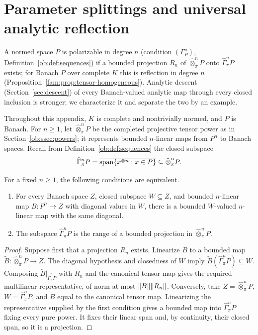 \section{Parameter splittings and universal analytic reflection}\label{app:reflection}\label{fam:sec:tensors}
A normed space $P$ is polarizable in degree $n$ (condition $(\Gamma^n_P)$, Definition~\ref{ob:def:sequences}) if a bounded
projection $R_n$ of $\widehat\otimes^n_\pi P$ onto $\widehat\Gamma^n_\pi P$ exists; for Banach $P$ over complete $K$ this is
reflection in degree $n$ (Proposition~\ref{fam:prop:tensor-homogeneous}). Analytic descent (Section~\ref{sec:descent}) of every
Banach-valued analytic map through every closed inclusion is stronger; we characterize it and separate the two by an example.

Throughout this appendix, $K$ is complete and nontrivially normed, and $P$ is Banach.
For $n\ge1$, let $\widehat\otimes^n_\pi P$ be the completed projective tensor power as in
Section~\ref{ob:ssec:powers}; it represents bounded $n$\nobreakdash-linear maps from $P^n$ to Banach spaces.
Recall from Definition~\ref{ob:def:sequences} the closed subspace
\[
 \widehat\Gamma^n_\pi P=\overline{\operatorname{span}\{x^{\otimes n}:x\in P\}}\subseteq \widehat\otimes^n_\pi P.
\]

\begin{proposition}\label{fam:prop:tensor-homogeneous}
For a fixed $n\ge1$, the following conditions are equivalent.
\begin{enumerate}
\item For every Banach space $Z$, closed subspace $W\subseteq Z$, and bounded $n$\nobreakdash-linear map
$B\colon P^n\to Z$ with diagonal values in $W$, there is a bounded $W$\nobreakdash-valued
$n$\nobreakdash-linear map with the same diagonal.
\item The subspace $\widehat\Gamma^n_\pi P$ is the range of a bounded projection in $\widehat\otimes^n_\pi P$.
\end{enumerate}
\end{proposition}

\begin{proof}
Suppose first that a projection $R_n$ exists. Linearize $B$ to a bounded map
$\widetilde B\colon \widehat\otimes^n_\pi P\to Z$. The diagonal hypothesis and closedness of $W$ imply
$\widetilde B(\widehat\Gamma^n_\pi P)\subseteq W$.
Composing $\widetilde B|_{\widehat\Gamma^n_\pi P}$ with $R_n$ and the canonical tensor map gives the required
multilinear representative, of norm at most $\lVert B\rVert\lVert R_n\rVert$.
Conversely, take $Z=\widehat\otimes^n_\pi P$, $W=\widehat\Gamma^n_\pi P$, and $B$ equal to the canonical tensor map.
Linearizing the representative supplied by the first condition gives a bounded map into $\widehat\Gamma^n_\pi P$
fixing every pure power. It fixes their linear span and, by continuity, their closed span, so it is a projection.
\end{proof}

